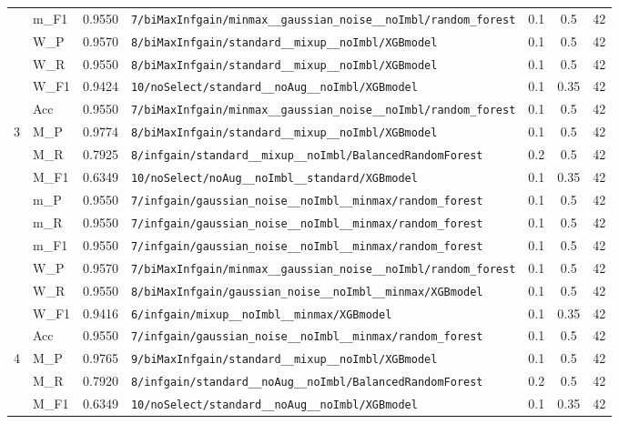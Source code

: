 \begin{table}[htbp]
\begin{tabular}{|c|l|c|>{\ttfamily\footnotesize}p{7.2cm}|c|c|c|}
 & m\_F1 & 0.9550 & \texttt{7/biMaxInfgain/minmax\_\_gaussian\_noise\_\_noImbl/random\_forest} & 0.1 & 0.5  & 42 \\ 
 & W\_P & 0.9570 & \texttt{8/biMaxInfgain/standard\_\_mixup\_\_noImbl/XGBmodel} & 0.1 & 0.5  & 42 \\ 
 & W\_R & 0.9550 & \texttt{8/biMaxInfgain/standard\_\_mixup\_\_noImbl/XGBmodel} & 0.1 & 0.5  & 42 \\ 
 & W\_F1 & 0.9424 & \texttt{10/noSelect/standard\_\_noAug\_\_noImbl/XGBmodel} & 0.1 & 0.35  & 42 \\ 
 & Acc & 0.9550 & \texttt{7/biMaxInfgain/minmax\_\_gaussian\_noise\_\_noImbl/random\_forest} & 0.1 & 0.5  & 42 \\ 
\hline
\multirow{10}{*}{3} & M\_P & 0.9774 & \texttt{8/biMaxInfgain/standard\_\_mixup\_\_noImbl/XGBmodel} & 0.1 & 0.5  & 42 \\ 
 & M\_R & 0.7925 & \texttt{8/infgain/standard\_\_mixup\_\_noImbl/BalancedRandomForest} & 0.2 & 0.5  & 42 \\ 
 & M\_F1 & 0.6349 & \texttt{10/noSelect/noAug\_\_noImbl\_\_standard/XGBmodel} & 0.1 & 0.35  & 42 \\ 
 & m\_P & 0.9550 & \texttt{7/infgain/gaussian\_noise\_\_noImbl\_\_minmax/random\_forest} & 0.1 & 0.5  & 42 \\ 
 & m\_R & 0.9550 & \texttt{7/infgain/gaussian\_noise\_\_noImbl\_\_minmax/random\_forest} & 0.1 & 0.5  & 42 \\ 
 & m\_F1 & 0.9550 & \texttt{7/infgain/gaussian\_noise\_\_noImbl\_\_minmax/random\_forest} & 0.1 & 0.5  & 42 \\ 
 & W\_P & 0.9570 & \texttt{7/biMaxInfgain/minmax\_\_gaussian\_noise\_\_noImbl/random\_forest} & 0.1 & 0.5  & 42 \\ 
 & W\_R & 0.9550 & \texttt{8/biMaxInfgain/gaussian\_noise\_\_noImbl\_\_minmax/XGBmodel} & 0.1 & 0.5  & 42 \\ 
 & W\_F1 & 0.9416 & \texttt{6/infgain/mixup\_\_noImbl\_\_minmax/XGBmodel} & 0.1 & 0.35  & 42 \\ 
 & Acc & 0.9550 & \texttt{7/infgain/gaussian\_noise\_\_noImbl\_\_minmax/random\_forest} & 0.1 & 0.5  & 42 \\ 
\hline
\multirow{10}{*}{4} & M\_P & 0.9765 & \texttt{9/biMaxInfgain/standard\_\_mixup\_\_noImbl/XGBmodel} & 0.1 & 0.5  & 42 \\ 
 & M\_R & 0.7920 & \texttt{8/infgain/standard\_\_noAug\_\_noImbl/BalancedRandomForest} & 0.2 & 0.5  & 42 \\ 
 & M\_F1 & 0.6349 & \texttt{10/noSelect/standard\_\_noAug\_\_noImbl/XGBmodel} & 0.1 & 0.35  & 42 \\ 

\end{tabular}
\end{table}

